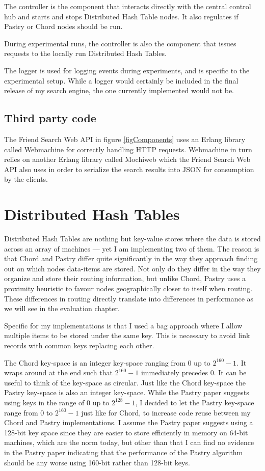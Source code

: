 The controller is the component that interacts directly with the central control hub and starts and stops Distributed Hash Table nodes. It also regulates if Pastry or Chord nodes should be run.

During experimental runs, the controller is also the component that issues requests to the locally run Distributed Hash Tables.

The logger is used for logging events during experiments, and is specific to the experimental setup. While a logger would certainly be included in the final release of my search engine, the one currently implemented would not be.

\subsection{Third party code}
The Friend Search Web API in figure \ref{figComponents} uses an Erlang library called Webmachine for correctly handling HTTP requests. Webmachine in turn relies on another Erlang library called Mochiweb which the Friend Search Web API also uses in order to serialize the search results into JSON for consumption by the clients.

\section{Distributed Hash Tables}
Distributed Hash Tables are nothing but key-value stores where the data is stored across an array of machines --- yet I am implementing two of them. The reason is that Chord and Pastry differ quite significantly in the way they approach finding out on which nodes data-items are stored. Not only do they differ in the way they organize and store their routing information, but unlike Chord, Pastry uses a proximity heuristic to favour nodes geographically closer to itself when routing. These differences in routing directly translate into differences in performance as we will see in the evaluation chapter.

Specific for my implementations is that I used a bag approach where I allow multiple items to be stored under the same key. This is necessary to avoid link records with common keys replacing each other.

The Chord key-space is an integer key-space ranging from 0 up to $2^{160} - 1$. It wraps around at the end such that $2^{160} - 1$ immediately precedes 0. It can be useful to think of the key-space as circular. Just like the Chord key-space the Pastry key-space is also an integer key-space. While the Pastry paper \cite{pastry} suggests using keys in the range of 0 up to $2^{128} - 1$, I decided to let the Pastry key-space range from 0 to $2^{160} - 1$ just like for Chord, to increase code reuse between my Chord and Pastry implementations.
I assume the Pastry paper suggests using a 128-bit key space since they are easier to store efficiently in memory on 64-bit machines, which are the norm today, but other than that I can find no evidence in the Pastry paper \cite{pastry} indicating that the performance of the Pastry algorithm should be any worse using 160-bit rather than 128-bit keys.

